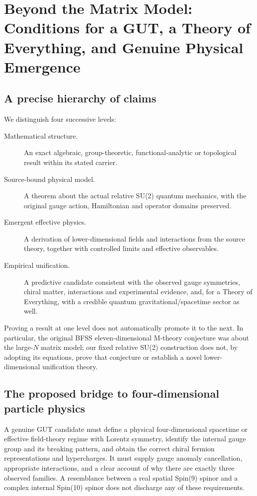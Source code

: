\chapter[Conditions for a GUT or ToE]{Beyond the Matrix Model: Conditions for a GUT, a Theory of Everything, and Genuine Physical Emergence}
\label{ch:unification-tests}

\section{A precise hierarchy of claims}
We distinguish four successive levels:
\begin{description}
\item[Mathematical structure.] An exact algebraic, group-theoretic,
functional-analytic or topological result within its stated carrier.
\item[Source-bound physical model.] A theorem about the actual
relative SU(2) quantum mechanics, with the original gauge action,
Hamiltonian and operator domains preserved.
\item[Emergent effective physics.] A derivation of lower-dimensional
fields and interactions from the source theory, together with
controlled limits and effective observables.
\item[Empirical unification.] A predictive candidate consistent with
the observed gauge symmetries, chiral matter, interactions and
experimental evidence, and, for a Theory of Everything, with a
credible quantum gravitational/spacetime sector as well.
\end{description}
Proving a result at one level does not automatically promote it to
the next. In particular, the original BFSS eleven-dimensional
M-theory conjecture was about the large-$N$ matrix model;
our fixed relative SU(2) construction does not, by adopting its
equations, prove that conjecture or establish a novel lower-dimensional
unification theory.

\section{The proposed bridge to four-dimensional particle physics}
A genuine GUT candidate must define a physical four-dimensional
spacetime or effective field-theory regime with Lorentz symmetry,
identify the internal gauge group and its breaking pattern, and
obtain the correct chiral fermion representations and hypercharges.
It must supply gauge anomaly cancellation, appropriate interactions,
and a clear account of why there are exactly three observed families.
A resemblance between a real spatial Spin(9) spinor and a complex
internal Spin(10) spinor does not discharge any of these requirements.

